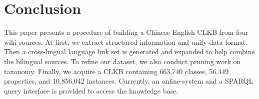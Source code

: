 \documentclass[runningheads,a4paper]{llncs}
\begin{document}
\section{Conclusion}
\label{sec:con}
This paper presents a procedure of building a Chinese-English CLKB from four wiki sources. At first, we extract structured information and unify data format. Then a cross-lingual language link set is generated and expanded to help combine the bilingual sources. To refine our dataset, we also conduct pruning work on taxonomy. Finally, we acquire a CLKB containing 663,740 classes, 56,449 properties, and 10,856,042 instances. Currently, an online-system and a SPARQL query interface is provided to access the knowledge base.





\end{document}
